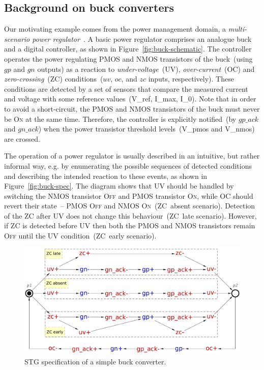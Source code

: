 \documentclass[british,compsoc]{IEEEtran}
\newcommand{\noun}[1]{\textsc{#1}}
\begin{document}
\subsection{Background on buck converters\label{sub:buck}}

Our motivating example comes from the power management domain, a
\emph{multi-scenario power regulator}~\cite{2014_sokolov_ftfc}.
A basic power regulator comprises an analogue buck and a digital controller,
as shown in Figure~\ref{fig:buck-schematic}. The controller operates
the power regulating PMOS and NMOS transistors of the buck~(using \textsf{$gp$}
and \textsf{$gn$} outputs) as a reaction to \emph{under-voltage}~(UV),
\emph{over-current}~(OC) and \emph{zero-crossing}~(ZC) conditions~(\textsf{$uv$},
\textsf{$oc$}, and \textsf{$zc$} inputs, respectively). These conditions
are detected by a set of sensors that compare the measured current and voltage
with some reference values~(\textsf{V\_ref}, \textsf{I\_max}, \textsf{I\_0}).
Note that in order to avoid a short-circuit, the PMOS and NMOS transistors of
the buck must never be \noun{On} at the same time. Therefore, the controller
is explicitly notified~(by \textsf{$gp\_ack$} and \textsf{$gn\_ack$})
when the power transistor threshold levels~(\textsf{V\_pmos} and \textsf{V\_nmos})
are crossed.

The operation of a power regulator is usually described in an intuitive,
but rather informal way, e.g. by enumerating the possible sequences
of detected conditions and describing the intended reaction to these
events, as shown in Figure~\ref{fig:buck-spec}. The diagram shows
that UV should be handled by switching the NMOS transistor \noun{Off}
and PMOS transistor \noun{On}, while OC should revert their state~--
PMOS \noun{Off} and NMOS \noun{On}~(ZC~absent scenario). Detection of
the ZC after UV does not change this behaviour~(ZC~late scenario).
However, if ZC is detected before UV then both the PMOS and NMOS transistors
remain \noun{Off} until the UV condition~(ZC~early scenario).

\begin{figure}[t]
\begin{centering}
\includegraphics[scale=0.23]{Images/stg-buck}
\par
\protect\caption{\label{fig:Monolithic-buck}STG specification of a simple buck converter.}
\par\end{centering}
\end{figure}
\end{document}
